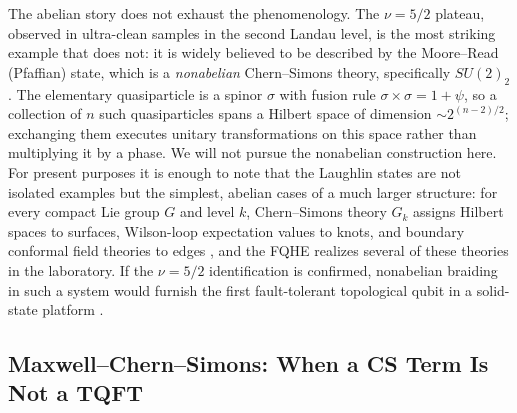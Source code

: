 The abelian story does not exhaust the phenomenology. The $\nu=5/2$ plateau, observed in ultra-clean samples in the second Landau level, is the most striking example that does not: it is widely believed to be described by the Moore--Read (Pfaffian) state, which is a \emph{nonabelian} Chern--Simons theory, specifically $SU(2)_{2}$ \cite{NayakSimonSternFreedmanDasSarma2008NonabelianAnyons}. The elementary quasiparticle is a spinor $\sigma$ with fusion rule $\sigma\times\sigma = 1 + \psi$, so a collection of $n$ such quasiparticles spans a Hilbert space of dimension $\sim 2^{(n-2)/2}$; exchanging them executes unitary transformations on this space rather than multiplying it by a phase. We will not pursue the nonabelian construction here. For present purposes it is enough to note that the Laughlin states are not isolated examples but the simplest, abelian cases of a much larger structure: for every compact Lie group $G$ and level $k$, Chern--Simons theory $G_k$ assigns Hilbert spaces to surfaces, Wilson-loop expectation values to knots, and boundary conformal field theories to edges \cite{Witten1989Jones,Dunne1999AspectsCS}, and the FQHE realizes several of these theories in the laboratory. If the $\nu=5/2$ identification is confirmed, nonabelian braiding in such a system would furnish the first fault-tolerant topological qubit in a solid-state platform \cite{NayakSimonSternFreedmanDasSarma2008NonabelianAnyons}.

\subsection{Maxwell--Chern--Simons: When a CS Term Is Not a TQFT}
\label{subsec:maxwell-cs}

%

